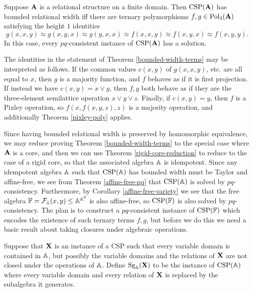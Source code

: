 \documentclass[letterpaper,11pt]{article}
\DeclareMathOperator{\Pol}{Pol}
\DeclareMathOperator{\CSP}{CSP}
\DeclareMathOperator{\Sg}{Sg}
\begin{document}
\begin{thm}\label{bounded-width-terms} Suppose $\mathbf{A}$ is a relational structure on a finite domain. Then $\CSP(\fA)$ has bounded relational width iff there are ternary polymorphisms $f,g \in \Pol_3(\fA)$ satisfying the height $1$ identities
\[
g(x,x,y) \approx g(x,y,x) \approx g(y,x,x) \approx f(x,x,y) \approx f(x,y,x) \approx f(x,y,y).
\]
In this case, every $pq$-consistent instance of $\CSP(\fA)$ has a solution.
\end{thm}

The identities in the statement of Theorem \ref{bounded-width-terms} may be interpreted as follows. If the common values $c(x,y)$ of $g(x,x,y)$, etc. are all equal to $x$, then $g$ is a majority function, and $f$ behaves as if it is first projection. If instead we have $c(x,y) = x \vee y$, then $f,g$ both behave as if they are the three-element semilattice operation $x \vee y \vee z$. Finally, if $c(x,y) = y$, then $f$ is a Pixley operation, so $f(x,f(x,y,z),z)$ is a majority operation, and additionally Theorem \ref{pixley-poly} applies.

Since having bounded relational width is preserved by homomorphic equivalence, we may reduce proving Theorem \ref{bounded-width-terms} to the special case where $\mathbf{A}$ is a core, and then we can use Theorem \ref{rigid-core-reduction} to reduce to the case of a rigid core, so that the associated algebra $\mathbb{A}$ is idempotent. Since any idempotent algebra $\mathbb{A}$ such that $\CSP(\bA)$ has bounded width must be Taylor and affine-free, we see from Theorem \ref{affine-free-pq} that $\CSP(\bA)$ is solved by $pq$-consistency. Furthermore, by Corollary \ref{affine-free-variety} we see that the free algebra $\mathbb{F} = \mathcal{F}_{\mathbb{A}}(x,y) \le \mathbb{A}^{\mathbb{A}^2}$ is also affine-free, so $\CSP(\bF)$ is also solved by $pq$-consistency. The plan is to construct a $pq$-consistent instance of $\CSP(\bF)$ which encodes the existence of such ternary terms $f,g$, but before we do this we need a basic result about taking closures under algebraic operations.

\begin{defn} Suppose that $\mathbf{X}$ is an instance of a CSP such that every variable domain is contained in $\mathbb{A}$, but possibly the variable domains and the relations of $\mathbf{X}$ are not closed under the operations of $\mathbb{A}$. Define $\Sg_\bA(\fX)$ to be the instance of $\CSP(\bA)$ where every variable domain and every relation of $\mathbf{X}$ is replaced by the subalgebra it generates.
\end{defn}
\end{document}
